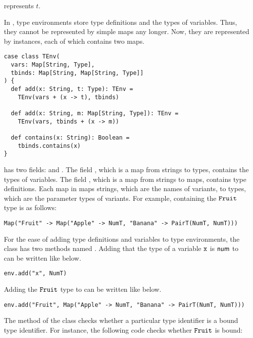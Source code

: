  represents $t$.

In \Lang, type environments store type definitions and the types of variables.
Thus, they cannot be represented by simple maps any longer. Now, they are
represented by  instances, each of which contains two maps.

\begin{verbatim}
case class TEnv(
  vars: Map[String, Type],
  tbinds: Map[String, Map[String, Type]]
) {
  def add(x: String, t: Type): TEnv =
    TEnv(vars + (x -> t), tbinds)

  def add(x: String, m: Map[String, Type]): TEnv =
    TEnv(vars, tbinds + (x -> m))

  def contains(x: String): Boolean =
    tbinds.contains(x)
}
\end{verbatim}

 has two fields:  and .
The field , which is a map from strings to \Lang types, contains
the types of variables. The field , which is a map from strings to
maps, contains type definitions. Each map in  maps strings, which
are the names of variants, to \Lang types, which are the parameter types
of variants. For example,  containing the $\texttt{Fruit}$ type is
as follows:

\begin{verbatim}
Map("Fruit" -> Map("Apple" -> NumT, "Banana" -> PairT(NumT, NumT)))
\end{verbatim}

For the ease of adding type definitions and variables to type environments, the 
class has two methods named . Adding that the type of a variable $\texttt{x}$ is
$\textsf{num}$ to  can be written like below.

\begin{verbatim}
env.add("x", NumT)
\end{verbatim}

Adding the $\texttt{Fruit}$ type to  can be written like below.

\begin{verbatim}
env.add("Fruit", Map("Apple" -> NumT, "Banana" -> PairT(NumT, NumT)))
\end{verbatim}

The  method of the  class checks whether a particular
type identifier is a bound type identifier. For instance,
the following code checks whether $\texttt{Fruit}$ is bound:

